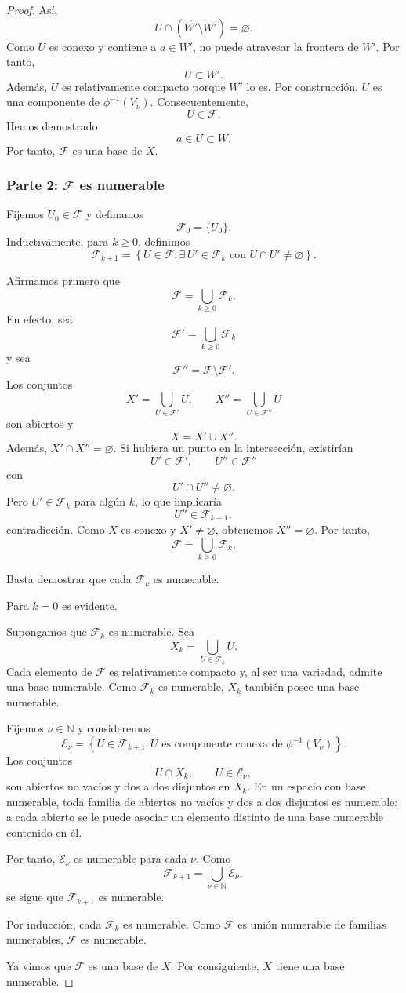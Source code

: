 \documentclass[11pt,a4paper]{article}
\theoremstyle{definition}
\theoremstyle{plain}
\theoremstyle{remark}
\newcommand{\N}{\mathbb N}
\begin{document}
\begin{proof}
Así,
\[
U\cap(\overline{W'}\setminus W')=\varnothing.
\]
Como $U$ es conexo y contiene a $a\in W'$, no puede atravesar la
frontera de $W'$. Por tanto,
\[
U\subset W'.
\]
Además, $U$ es relativamente compacto porque $W'$ lo es. Por
construcción, $U$ es una componente de $\phi^{-1}(V_\nu)$.
Consecuentemente,
\[
U\in\mathcal F.
\]
Hemos demostrado
\[
a\in U\subset W.
\]
Por tanto, $\mathcal F$ es una base de $X$.

\subsubsection*{Parte 2: $\mathcal F$ es numerable}

Fijemos $U_0\in\mathcal F$ y definamos
\[
\mathcal F_0=\{U_0\}.
\]
Inductivamente, para $k\geq0$, definimos
\[
\mathcal F_{k+1}
=
\left\{
U\in\mathcal F:
\exists\,U'\in\mathcal F_k
\text{ con }
U\cap U'\neq\varnothing
\right\}.
\]

Afirmamos primero que
\[
\mathcal F=\bigcup_{k\geq0}\mathcal F_k.
\]
En efecto, sea
\[
\mathcal F'=\bigcup_{k\geq0}\mathcal F_k
\]
y sea
\[
\mathcal F''=\mathcal F\setminus\mathcal F'.
\]
Los conjuntos
\[
X'=\bigcup_{U\in\mathcal F'}U,
\qquad
X''=\bigcup_{U\in\mathcal F''}U
\]
son abiertos y
\[
X=X'\cup X''.
\]
Además, $X'\cap X''=\varnothing$. Si hubiera un punto en la
intersección, existirían
\[
U'\in\mathcal F',
\qquad
U''\in\mathcal F''
\]
con
\[
U'\cap U''\neq\varnothing.
\]
Pero $U'\in\mathcal F_k$ para algún $k$, lo que implicaría
\[
U''\in\mathcal F_{k+1},
\]
contradicción. Como $X$ es conexo y $X'\neq\varnothing$, obtenemos
$X''=\varnothing$. Por tanto,
\[
\mathcal F=\bigcup_{k\geq0}\mathcal F_k.
\]

Basta demostrar que cada $\mathcal F_k$ es numerable.

Para $k=0$ es evidente.

Supongamos que $\mathcal F_k$ es numerable. Sea
\[
X_k=\bigcup_{U\in\mathcal F_k}U.
\]
Cada elemento de $\mathcal F$ es relativamente compacto y, al ser
una variedad, admite una base numerable. Como $\mathcal F_k$ es
numerable, $X_k$ también posee una base numerable.

Fijemos $\nu\in\N$ y consideremos
\[
\mathcal E_\nu
=
\left\{
U\in\mathcal F_{k+1}:
U\text{ es componente conexa de }\phi^{-1}(V_\nu)
\right\}.
\]
Los conjuntos
\[
U\cap X_k,
\qquad U\in\mathcal E_\nu,
\]
son abiertos no vacíos y dos a dos disjuntos en $X_k$. En un espacio
con base numerable, toda familia de abiertos no vacíos y dos a dos
disjuntos es numerable: a cada abierto se le puede asociar un elemento
distinto de una base numerable contenido en él.

Por tanto, $\mathcal E_\nu$ es numerable para cada $\nu$. Como
\[
\mathcal F_{k+1}
=
\bigcup_{\nu\in\N}\mathcal E_\nu,
\]
se sigue que $\mathcal F_{k+1}$ es numerable.

Por inducción, cada $\mathcal F_k$ es numerable. Como
$\mathcal F$ es unión numerable de familias numerables, $\mathcal F$
es numerable.

Ya vimos que $\mathcal F$ es una base de $X$. Por consiguiente, $X$
tiene una base numerable.
\end{proof}
\end{document}
